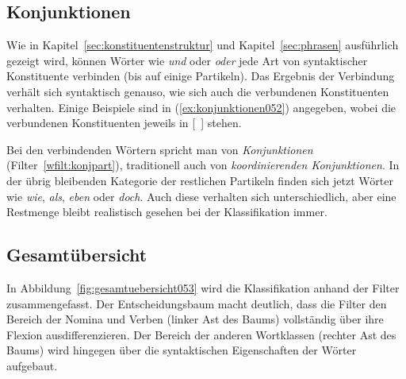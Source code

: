 
\subsection{Konjunktionen}
\label{sec:konjunktionen}


Wie in Kapitel~\ref{sec:konstituentenstruktur} und Kapitel~\ref{sec:phrasen} ausführlich gezeigt wird, können Wörter wie \textit{und} oder \textit{oder} jede Art von syntaktischer Konstituente verbinden (bis auf einige Partikeln).
Das Ergebnis der Verbindung verhält sich syntaktisch genauso, wie sich auch die verbundenen Konstituenten verhalten.
Einige Beispiele sind in (\ref{ex:konjunktionen052}) angegeben, wobei die verbundenen Konstituenten jeweils in [~] stehen.

\begin{exe}
  \ex\label{ex:konjunktionen052}
  \begin{xlist}
  \end{xlist}
\end{exe}

Bei den verbindenden Wörtern spricht man von \textit{Konjunktionen} (Filter~\ref{wfilt:konjpart}), traditionell auch von \textit{koordinierenden Konjunktionen}.
In der übrig bleibenden Kategorie der restlichen Partikeln finden sich jetzt Wörter wie \textit{wie}, \textit{als}, \textit{eben} oder \textit{doch}.
Auch diese verhalten sich unterschiedlich, aber eine Restmenge bleibt realistisch gesehen bei der Klassifikation immer.


\subsection{Gesamtübersicht}
\label{sec:gesamtuebersicht}

In Abbildung~\ref{fig:gesamtuebersicht053} wird die Klassifikation anhand der Filter zusammengefasst.
Der Entscheidungsbaum macht deutlich, dass die Filter den Bereich der Nomina und Verben (linker Ast des Baums) vollständig über ihre Flexion ausdifferenzieren.
Der Bereich der anderen Wortklassen (rechter Ast des Baums) wird hingegen über die syntaktischen Eigenschaften der Wörter aufgebaut.

